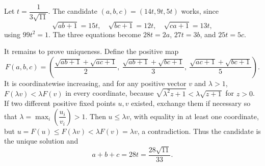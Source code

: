 Let $t=\dfrac{1}{3\sqrt{11}}$. The candidate $(a,b,c)=(14t,9t,5t)$ works, since
\[
\sqrt{ab+1}=15t,\quad\sqrt{bc+1}=12t,\quad\sqrt{ca+1}=13t,
\]
using $99t^2=1$. The three equations become $28t=2a$, $27t=3b$, and $25t=5c$.

It remains to prove uniqueness. Define the positive map
\[
F(a,b,c)=\left(\dfrac{\sqrt{ab+1}+\sqrt{ac+1}}{2},\ 
\dfrac{\sqrt{ab+1}+\sqrt{bc+1}}{3},\ 
\dfrac{\sqrt{ac+1}+\sqrt{bc+1}}{5}\right).
\]
It is coordinatewise increasing, and for any positive vector $v$ and $\lambda>1$,
$F(\lambda v)<\lambda F(v)$ in every coordinate, because $\sqrt{\lambda^2z+1}<\lambda\sqrt{z+1}$ for $z>0$.
If two different positive fixed points $u,v$ existed, exchange them if necessary so that $\lambda=\max_i(\dfrac{u_i}{v_i})>1$. Then $u\le\lambda v$, with equality in at least one coordinate, but
$u=F(u)\le F(\lambda v)<\lambda F(v)=\lambda v$, a contradiction.
Thus the candidate is the unique solution and
\[
\boxed{a+b+c=28t=\dfrac{28\sqrt{11}}{33}}.
\]
